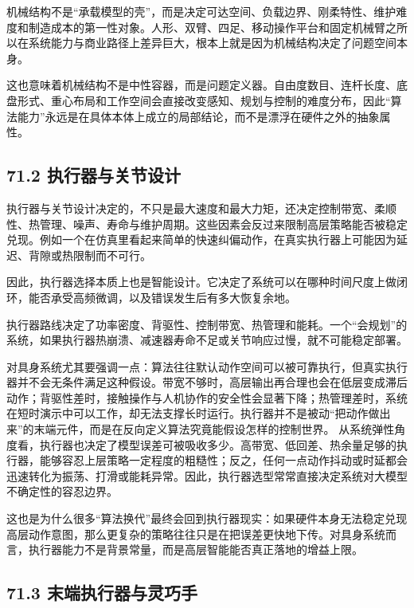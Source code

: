 机械结构不是“承载模型的壳”，而是决定可达空间、负载边界、刚柔特性、维护难度和制造成本的第一性对象。人形、双臂、四足、移动操作平台和固定机械臂之所以在系统能力与商业路径上差异巨大，根本上就是因为机械结构决定了问题空间本身。

这也意味着机械结构不是中性容器，而是问题定义器。自由度数目、连杆长度、底盘形式、重心布局和工作空间会直接改变感知、规划与控制的难度分布，因此“算法能力”永远是在具体本体上成立的局部结论，而不是漂浮在硬件之外的抽象属性。

\subsection*{71.2 执行器与关节设计}


执行器与关节设计决定的，不只是最大速度和最大力矩，还决定控制带宽、柔顺性、热管理、噪声、寿命与维护周期。这些因素会反过来限制高层策略能否被稳定兑现。例如一个在仿真里看起来简单的快速纠偏动作，在真实执行器上可能因为延迟、背隙或热限制而不可行。

因此，执行器选择本质上也是智能设计。它决定了系统可以在哪种时间尺度上做闭环，能否承受高频微调，以及错误发生后有多大恢复余地。

执行器路线决定了功率密度、背驱性、控制带宽、热管理和能耗。一个“会规划”的系统，如果执行器热崩溃、减速器寿命不足或关节响应过慢，就不可能稳定部署。

对具身系统尤其要强调一点：算法往往默认动作空间可以被可靠执行，但真实执行器并不会无条件满足这种假设。带宽不够时，高层输出再合理也会在低层变成滞后动作；背驱性差时，接触操作与人机协作的安全性会显著下降；热管理差时，系统在短时演示中可以工作，却无法支撑长时运行。执行器并不是被动“把动作做出来”的末端元件，而是在反向定义算法究竟能假设怎样的控制世界。 从系统弹性角度看，执行器也决定了模型误差可被吸收多少。高带宽、低回差、热余量足够的执行器，能够容忍上层策略一定程度的粗糙性；反之，任何一点动作抖动或时延都会迅速转化为振荡、打滑或能耗异常。因此，执行器选型常常直接决定系统对大模型不确定性的容忍边界。

这也是为什么很多“算法换代”最终会回到执行器现实：如果硬件本身无法稳定兑现高层动作意图，那么更复杂的策略往往只是在把误差更快地下传。对具身系统而言，执行器能力不是背景常量，而是高层智能能否真正落地的增益上限。

\subsection*{71.3 末端执行器与灵巧手}


